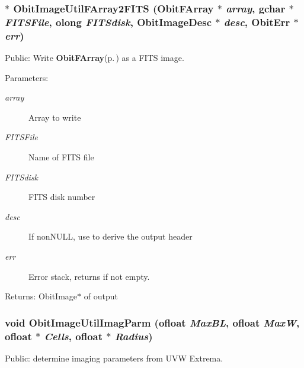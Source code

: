 \subsubsection{$\ast$ Obit\-Image\-Util\-FArray2FITS ({\bf Obit\-FArray} $\ast$ {\em array}, gchar $\ast$ {\em FITSFile}, {\bf olong} {\em FITSdisk}, {\bf Obit\-Image\-Desc} $\ast$ {\em desc}, {\bf Obit\-Err} $\ast$ {\em err})}\label{ObitImageUtil_8c_a25}


Public: Write {\bf Obit\-FArray}{\rm (p.\,\pageref{structObitFArray})} as a FITS image. 

\begin{Desc}
\item[Parameters:]
\begin{description}
\item[{\em array}]Array to write \item[{\em FITSFile}]Name of FITS file \item[{\em FITSdisk}]FITS disk number \item[{\em desc}]If non\-NULL, use to derive the output header \item[{\em err}]Error stack, returns if not empty. \end{description}
\end{Desc}
\begin{Desc}
\item[Returns:]Obit\-Image$\ast$ of output \end{Desc}
\subsubsection{\setlength{\rightskip}{0pt plus 5cm}void Obit\-Image\-Util\-Imag\-Parm ({\bf ofloat} {\em Max\-BL}, {\bf ofloat} {\em Max\-W}, {\bf ofloat} $\ast$ {\em Cells}, {\bf ofloat} $\ast$ {\em Radius})}\label{ObitImageUtil_8c_a15}


Public: determine imaging parameters from UVW Extrema. 

